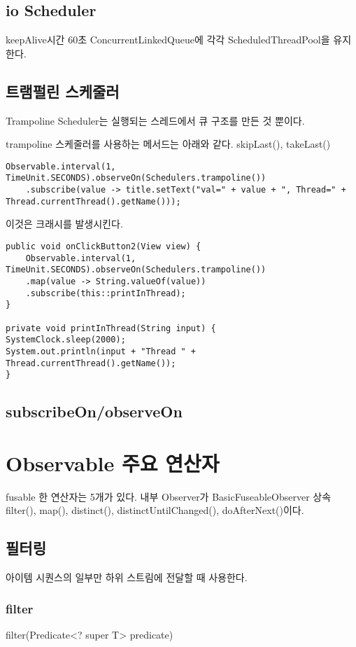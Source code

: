 \documentclass{book}
\begin{document}
{\section{io Scheduler}
keepAlive시간 60초
ConcurrentLinkedQueue에 각각 ScheduledThreadPool을 유지한다.

\section{트램펄린 스케줄러}
Trampoline Scheduler는 실행되는 스레드에서 큐 구조를 만든 것 뿐이다.

trampoline 스케줄러를 사용하는 메서드는 아래와 같다.
skipLast(), takeLast()

\begin{verbatim}
Observable.interval(1, TimeUnit.SECONDS).observeOn(Schedulers.trampoline())
	.subscribe(value -> title.setText("val=" + value + ", Thread=" + 		Thread.currentThread().getName()));
\end{verbatim}

이것은 크래시를 발생시킨다.

\begin{verbatim}
public void onClickButton2(View view) {
	Observable.interval(1, TimeUnit.SECONDS).observeOn(Schedulers.trampoline())
	.map(value -> String.valueOf(value))
	.subscribe(this::printInThread);
}

private void printInThread(String input) {
SystemClock.sleep(2000);
System.out.println(input + "Thread " + Thread.currentThread().getName());
}
\end{verbatim}

\section{subscribeOn/observeOn}


\chapter{Observable 주요 연산자}

fusable 한 연산자는 5개가 있다.
내부 Observer가 BasicFuseableObserver 상속
filter(), map(), distinct(), distinctUntilChanged(), doAfterNext()이다.

\section{필터링}
아이템 시퀀스의 일부만 하위 스트림에 전달할 때 사용한다.
\subsection{filter}
filter(Predicate<? super T> predicate)

}
\end{document}
